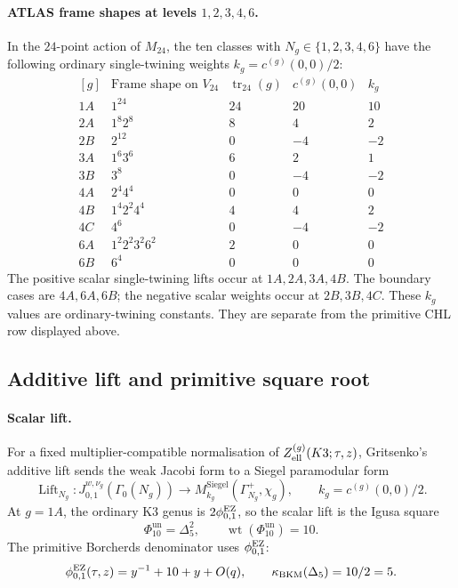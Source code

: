 \paragraph{ATLAS frame shapes at levels \(1,2,3,4,6\).}
In the \(24\)-point action of \(M_{24}\), the ten classes with
\(N_g\in\{1,2,3,4,6\}\) have the following ordinary single-twining
weights \(k_g=c^{(g)}(0,0)/2\):
\[
\begin{array}{c|c|c|c|c}
[g] & \text{Frame shape on }V_{24} & \operatorname{tr}_{24}(g)
& c^{(g)}(0,0) & k_g\\ \hline
1A & 1^{24} & 24 & 20 & 10\\
2A & 1^8 2^8 & 8 & 4 & 2\\
2B & 2^{12} & 0 & -4 & -2\\
3A & 1^6 3^6 & 6 & 2 & 1\\
3B & 3^8 & 0 & -4 & -2\\
4A & 2^4 4^4 & 0 & 0 & 0\\
4B & 1^4 2^2 4^4 & 4 & 4 & 2\\
4C & 4^6 & 0 & -4 & -2\\
6A & 1^2 2^2 3^2 6^2 & 2 & 0 & 0\\
6B & 6^4 & 0 & 0 & 0
\end{array}
\]
The positive scalar single-twining lifts occur at \(1A,2A,3A,4B\).
The boundary cases are \(4A,6A,6B\); the negative scalar weights occur
at \(2B,3B,4C\).  These \(k_g\) values are ordinary-twining constants.
They are separate from the primitive CHL row displayed above.

\subsection*{Additive lift and primitive square root}

\paragraph{Scalar lift.}
For a fixed multiplier-compatible normalisation of
\(Z^{(g)}_{\mathrm{ell}}(K3;\tau,z)\), Gritsenko's additive lift sends the weak Jacobi
form to a Siegel paramodular form
\[
  \operatorname{Lift}_{N_g}\colon
  J^{w,\nu_g}_{0,1}\!\left(\Gamma_0(N_g)\right)
  \longrightarrow
  M^{\mathrm{Siegel}}_{k_g}\!\left(\Gamma^+_{N_g},\chi_g\right),
  \qquad
  k_g=c^{(g)}(0,0)/2.
\]
At \(g=1A\), the ordinary K3 genus is \(2\phi_{0,1}^{\mathrm{EZ}}\), so the scalar lift is
the Igusa square
\[
  \Phi_{10}^{\mathrm{un}}=\Delta_5^2,
  \qquad
  \operatorname{wt}(\Phi_{10}^{\mathrm{un}})=10.
\]
The primitive Borcherds denominator uses \(\phi_{0,1}^{\mathrm{EZ}}\):
\[
  \phi_{0,1}^{\mathrm{EZ}}(\tau,z)=y^{-1}+10+y+O(q),
  \qquad
  \kappa_{\mathrm{BKM}}(\Delta_5)=10/2=5.
\]

